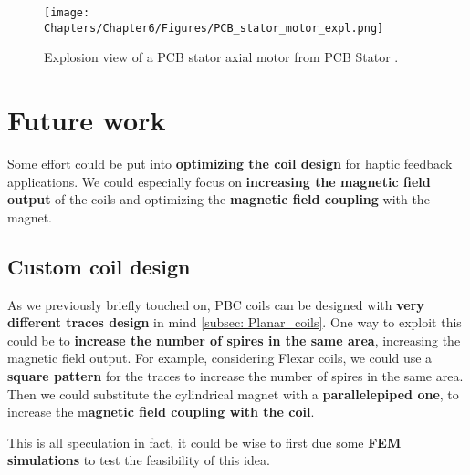 \begin{figure}[H]
    \centering
    \texttt{[image: Chapters/Chapter6/Figures/PCB\_stator\_motor\_expl.png]}
    \caption[Explosion view of a PCB stator axial motor from PCB Stator.]{Explosion view of a PCB stator axial motor from PCB Stator \cite{PCBStator}.}
    \label{fig:PCB_motor}
\end{figure}

\section{Future work}
Some effort could be put into \textbf{optimizing the coil design} for haptic feedback applications.
We could especially focus on \textbf{increasing the magnetic field output} of the coils and optimizing the \textbf{magnetic field coupling} with the magnet.

\subsection{Custom coil design}
As we previously briefly touched on, PBC coils can be designed with \textbf{very different traces design} in mind \ref{subsec: Planar_coils}.
One way to exploit this could be to \textbf{increase the number of spires in the same area}, increasing the magnetic field output.
For example, considering Flexar coils, we could use a \textbf{square pattern} for the traces to increase the number of spires in the same area.
Then we could substitute the cylindrical magnet with a \textbf{parallelepiped one}, to increase the m\textbf{agnetic field coupling with the coil}.

This is all speculation in fact, it could be wise to first due some \textbf{FEM simulations} to test the feasibility of this idea.